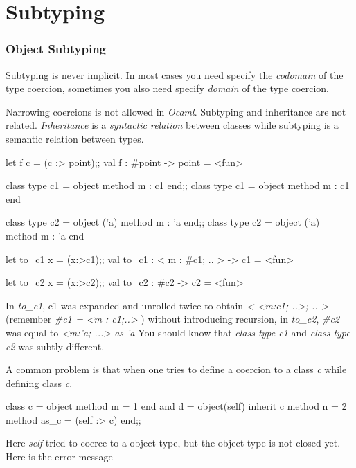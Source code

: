 \section{Subtyping}

\subsubsection{Object Subtyping}
Subtyping is never implicit. In most cases you need specify the
\textit{codomain} of the type coercion, sometimes you also need
specify \textit{domain} of the type coercion.

Narrowing coercions is not allowed in \textit{Ocaml}. Subtyping and
inheritance are not related. \textit{Inheritance} is a
\textit{syntactic relation} between classes while subtyping is a
semantic relation between types.

\begin{ocamlcode}
let f c = (c :> point);;
val f : #point -> point = <fun>  
\end{ocamlcode}

\begin{ocamlcode}
class type c1 = object method m : c1  end;;
class type c1 = object method m : c1 end

class type c2 = object ('a) method m : 'a  end;;
class type c2 = object ('a) method m : 'a end

let to_c1 x = (x:>c1);;
val to_c1 : < m : #c1; .. > -> c1 = <fun>

let to_c2 x = (x:>c2);;
val to_c2 : #c2 -> c2 = <fun>
\end{ocamlcode}

In \textit{to\_c1}, c1 was expanded and unrolled twice to obtain
\textit{< <m:c1; ..>; .. >} (remember \textit{\#c1 = <m : c1;..> })
without introducing recursion, in \textit{to\_c2}, \textit{\#c2} was
equal to \textit{<m:'a; ...> as 'a}
You should know that \textit{class type c1} and \textit{class type c2}
was subtly different.


A common problem is that when one tries to define a coercion to a
class \textit{c} while defining class \textit{c}.


\begin{ocamlcode}
class c = object
    method m = 1
  end
  and d = object(self)
  inherit c
  method n = 2
  method as_c = (self :> c)
  end;;
\end{ocamlcode}
Here \textit{self} tried to coerce to a object type, but the object
type is not closed yet.  Here is the error message


